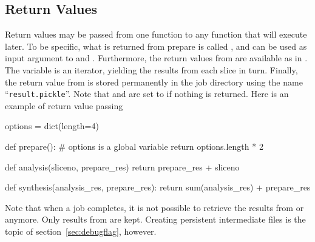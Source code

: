 \subsection{Return Values}
Return values may be passed from one function to any function that
will execute later.  To be specific, what is returned from prepare is
called \prepareres, and can be used as input argument to \analysis and
\synthesis.  Furthermore, the return values from \analysis are
available as \analysisres in \synthesis.  The \analysisres variable is
an iterator, yielding the results from each slice in turn.  Finally,
the return value from \synthesis is stored permanently in the job
directory using the name ``\texttt{result.pickle}''.  Note
that \prepareres and \analysisres are set to \pyNone if nothing is
returned.  Here is an example of return value passing
\begin{python}
options = dict(length=4)

def prepare():
    # options is a global variable
    return options.length * 2

def analysis(sliceno, prepare_res)
    return prepare_res + sliceno

def synthesis(analysis_res, prepare_res):
     return sum(analysis_res) + prepare_res
\end{python}
Note that when a job completes, it is not possible to retrieve the
results from \prepare or \analysis anymore.  Only results from
\synthesis are kept.  Creating persistent intermediate files is the topic of
section~\ref{sec:debugflag}, however.


